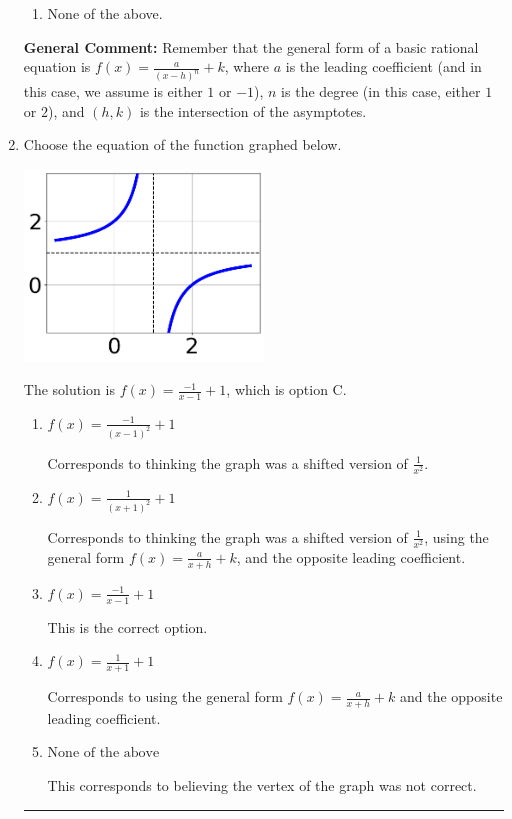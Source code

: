 \documentclass{extbook}[14pt]
\newcommand{\litem}[1]{\item #1

\rule{\textwidth}{0.4pt}}
\begin{document}
\begin{enumerate}
{\begin{enumerate}[label=\Alph*.]
\begin{multicols}{2}
\end{multicols}\item None of the above.\end{enumerate}
\textbf{General Comment:} Remember that the general form of a basic rational equation is $ f(x) = \frac{a}{(x-h)^n} + k$, where $a$ is the leading coefficient (and in this case, we assume is either $1$ or $-1$), $n$ is the degree (in this case, either $1$ or $2$), and $(h, k)$ is the intersection of the asymptotes.
}
\litem{
Choose the equation of the function graphed below.

\begin{center}
    \includegraphics[width=0.5\textwidth]{../Figures/rationalGraphToEquationB.png}
\end{center}



The solution is \( f(x) = \frac{-1}{x - 1} + 1 \), which is option C.\begin{enumerate}[label=\Alph*.]
\item \( f(x) = \frac{-1}{(x - 1)^2} + 1 \)

Corresponds to thinking the graph was a shifted version of $\frac{1}{x^2}$.
\item \( f(x) = \frac{1}{(x + 1)^2} + 1 \)

Corresponds to thinking the graph was a shifted version of $\frac{1}{x^2}$, using the general form $f(x) = \frac{a}{x+h}+k$, and the opposite leading coefficient.
\item \( f(x) = \frac{-1}{x - 1} + 1 \)

This is the correct option.
\item \( f(x) = \frac{1}{x + 1} + 1 \)

Corresponds to using the general form $f(x) = \frac{a}{x+h}+k$ and the opposite leading coefficient.
\item \( \text{None of the above} \)

This corresponds to believing the vertex of the graph was not correct.
\end{enumerate}

}
\end{enumerate}
\end{document}
